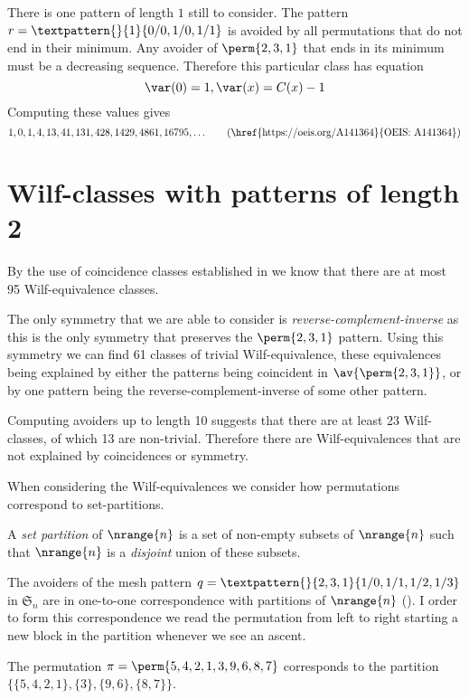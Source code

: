 \nextvar[\varmaxl]
There is one pattern of length \(1\) still to consider. The pattern
\(r = \textpattern{}{1}{0/0,1/0,1/1}\) is avoided by all permutations
that do not end in their minimum. Any avoider of \(\perm{2,3,1}\) that
ends in its minimum must be a decreasing sequence.
Therefore this particular class has equation
\begin{equation*}
    \var(0) = 1, \var(x) = C(x)-1
\end{equation*}
Computing these values gives
\begin{equation*}
    	1, 0, 1, 4, 13, 41, 131, 428, 1429, 4861, 16795,\dotsc
\tag{\href{https://oeis.org/A141364}{OEIS: A141364}}
\end{equation*}

\section{Wilf-classes with patterns of length 2}
By the use of coincidence classes established in
 we know that there are at most 95 Wilf-equivalence classes.

The only symmetry that we are able to consider is \emph{reverse-complement-inverse} as this is the only symmetry that preserves the
\(\perm{2,3,1}\) pattern. Using this symmetry we can find 61 classes of trivial
Wilf-equivalence, these equivalences being explained by either the patterns being
coincident in \(\av{\perm{2,3,1}}\), or by one pattern being the reverse-complement-inverse of some other pattern.

Computing avoiders up to length 10 suggests that there are at least 23 Wilf-classes,
of which 13 are non-trivial. Therefore there are Wilf-equivalences that are not
explained by coincidences or symmetry.

When considering the Wilf-equivalences we consider how permutations correspond
to set-partitions.

\begin{definition} A \emph{set partition} of \(\nrange{n}\) is a set of non-empty subsets of \(\nrange{n}\)
such that \(\nrange{n}\) is a \emph{disjoint} union of these subsets.
\end{definition}

\begin{note}
  The avoiders of the mesh pattern \(q = %
\textpattern{}{2,3,1}{1/0,1/1,1/2,1/3}\) in \(\mathfrak{S}_n\) are in one-to-one correspondence with partitions
of \(\nrange{n}\) (\textcite[Prop.~2]{DBLP:journals/ejc/Claesson01}).
I order to form this correspondence we read the permutation from left to right starting a
new block in the partition whenever we see an ascent.
\end{note}
\begin{example}
    The permutation \(\pi = \perm{5,4,2,1,3,9,6,8,7}\) corresponds to the
    partition \(\{\{5,4,2,1\},\{3\},\{9,6\},\{8,7\}\}\).
\end{example}

